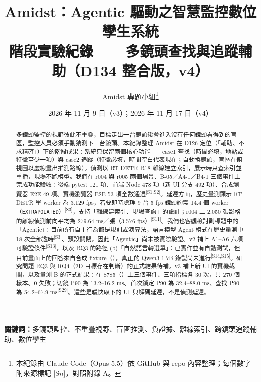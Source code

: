 \documentclass[11pt,a4paper]{article}
\title{\sffamily\bfseries Amidst：Agentic 驅動之智慧監控數位孿生系統\\[4pt]
\large 階段實驗紀錄——多鏡頭查找與追蹤輔助（D134 整合版，v4）}
\author{Amidst 專題小組\thanks{本紀錄由 Claude Code（Opus 5.5）依 GitHub 與 repo 內容整理；每個數字附來源標記 [S$n$]，對照附錄 A。}}
\date{2026 年 11 月 9 日（v3）；2026 年 11 月 17 日（v4）}
\newcommand{\src}[1]{\textsuperscript{\scriptsize[#1]}}
\newcommand{\EXT}{\texttt{EXTRAPOLATED}}
\newcommand{\code}[1]{\texttt{\detokenize{#1}}}
\begin{document}
\maketitle

\begin{abstract}
\noindent 多鏡頭監控的視野彼此不重疊，目標走出一台鏡頭後會進入沒有任何鏡頭看得到的盲區，監控人員必須手動猜測下一台鏡頭。本紀錄整理 Amidst 在 D126 定位（「輔助、不求精確」）下的階段成果：系統只保留兩個核心功能——case1 查找（時間必填，地點或特徵至少一項）與 case2 追蹤（特徵必填，時間空白代表現在；自動換鏡頭，盲區在俯視圖以虛線畫出推測路線）。偵測以 RT-DETR R18 離線建立索引，展示時只查索引並重播，現場不跑模型。我們在 r004 與 r005 兩個場景、B-05／A4-1／B4-1 三個事件上完成功能驗收：後端 pytest 121 項、前端 Node 478 項（新 UI 分支 492 項）、合成瀏覽器 E2E 49 項、實機瀏覽器 E2E 53 項全數通過\src{S1,S2}。延遲方面，歷史量測顯示 RT-DETR 單 worker 為 3.129 fps，若要即時處理 9 台 5 fps 鏡頭約需 14.4 個 worker（\EXT）\src{S3}，支持「離線建索引、現場查詢」的設計；r004 上 2,050 張影格的離線偵測前向平均為 279.64 ms／張（3.576 fps）\src{S11}。我們也客觀檢討副標題中的「Agentic」：目前所有自主行為都是規則或演算法，語言模型 Agent 模式在歷史量測中 18 次全部逾時\src{S3}、預設關閉，因此「Agentic」尚未被實際驗證。v2 補上 A1–A6 六項可驗證條件\src{S13}，以及 RQ3 的路徑 (b)「自然語言轉選單」：已實作並有自動測試，但目前畫面上的回答來自合成 fixture（\code{SYNTHETIC_FIXTURE}），真正的 Qwen3 1.7B 錄製尚未進行\src{S14,S15}。研究問題 RQ3 與 RQ4（2D 目標存在判斷）的正式結果待補。v3 補上新 UI 的實機截圖，以及量測 B 的正式結果：在 8785（\code{89a73e6}）上三個事件、三項指標各 30 次，共 270 個樣本、0 失敗；切鏡 P90 為 13.2–16.2 ms、首次鎖定 P90 為 32.4–88.0 ms、查找 P90 為 54.2–67.9 ms\src{S29}。這些是暖快取下的 UI 與解碼延遲，不是偵測延遲。
\end{abstract}

\begin{center}\end{center}

\noindent\textbf{關鍵詞：}多鏡頭監控、不重疊視野、盲區推測、負證據、離線索引、跨鏡頭追蹤輔助、數位孿生
\end{document}
